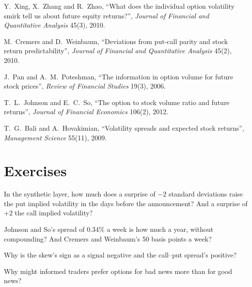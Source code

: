 \begin{omsources}
\item Y.~Xing, X.~Zhang and R.~Zhao, ``What does the individual option volatility smirk tell us about future equity returns?'', \emph{Journal of Financial and
Quantitative Analysis} 45(3), 2010.
\item M.~Cremers and D.~Weinbaum, ``Deviations from put-call parity and stock return predictability'', \emph{Journal of Financial and Quantitative Analysis}
45(2), 2010.
\item J.~Pan and A.~M.~Poteshman, ``The information in option volume for future stock prices'', \emph{Review of Financial Studies} 19(3), 2006.
\item T.~L.~Johnson and E.~C.~So, ``The option to stock volume ratio and future returns'', \emph{Journal of Financial Economics} 106(2), 2012.
\item T.~G.~Bali and A.~Hovakimian, ``Volatility spreads and expected stock returns'', \emph{Management Science} 55(11), 2009.
\end{omsources}

\section{Exercises}

\begin{exercise}[$\star$]\label{exo:s1:options-implied-signals-for-stocks:1}
In the synthetic layer, how much does a surprise of $-2$ standard deviations raise the put implied volatility in the days before the announcement? And a
surprise of $+2$ the call implied volatility?
\end{exercise}

\begin{exercise}[$\star$]\label{exo:s1:options-implied-signals-for-stocks:2}
Johnson and So's spread of 0.34\% a week is how much a year, without compounding? And Cremers and Weinbaum's 50 basis points a week?
\end{exercise}

\begin{exercise}[$\star$]\label{exo:s1:options-implied-signals-for-stocks:3}
Why is the skew's sign as a signal negative and the call--put spread's positive?
\end{exercise}

\begin{exercise}[$\star\star$]\label{exo:s1:options-implied-signals-for-stocks:4}
Why might informed traders prefer options for bad news more than for good news?
\end{exercise}

